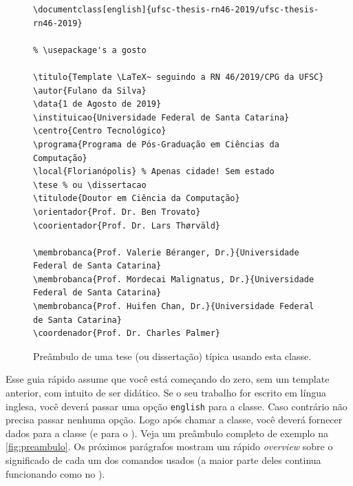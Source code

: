 \documentclass[embeddedlogo]{ufsc-thesis-rn46-2019}
\begin{document}
\begin{figure}[tb]
  \centering
  \caption{Preâmbulo de uma tese (ou dissertação) típica usando esta classe.}
  \label{fig:preambulo}

  \begin{verbatim}
\documentclass[english]{ufsc-thesis-rn46-2019/ufsc-thesis-rn46-2019}

% \usepackage's a gosto

\titulo{Template \LaTeX~ seguindo a RN 46/2019/CPG da UFSC}
\autor{Fulano da Silva}
\data{1 de Agosto de 2019}
\instituicao{Universidade Federal de Santa Catarina}
\centro{Centro Tecnológico}
\programa{Programa de Pós-Graduação em Ciências da Computação}
\local{Florianópolis} % Apenas cidade! Sem estado
\tese % ou \dissertacao
\titulode{Doutor em Ciência da Computação}
\orientador{Prof. Dr. Ben Trovato}
\coorientador{Prof. Dr. Lars Thørväld}

\membrobanca{Prof. Valerie Béranger, Dr.}{Universidade Federal de Santa Catarina}
\membrobanca{Prof. Mordecai Malignatus, Dr.}{Universidade Federal de Santa Catarina}
\membrobanca{Prof. Huifen Chan, Dr.}{Universidade Federal de Santa Catarina}
\coordenador{Prof. Dr. Charles Palmer}
  \end{verbatim}
\end{figure}

Esse guia rápido assume que você está começando do zero, sem um template
anterior, com intuito de ser didático. Se o seu trabalho for escrito em língua
inglesa, você deverá passar uma opção \texttt{english} para a classe. Caso
contrário não precisa passar nenhuma opção. Logo após chamar a classe, você
deverá fornecer dados para a classe (e para o \abnTeX). Veja um preâmbulo
completo de exemplo na \autoref{fig:preambulo}. Os próximos parágrafos mostram um
rápido \emph{overview} sobre o significado de cada um dos comandos usados (a
maior parte deles continua funcionando como no \abnTeX).
\end{document}
